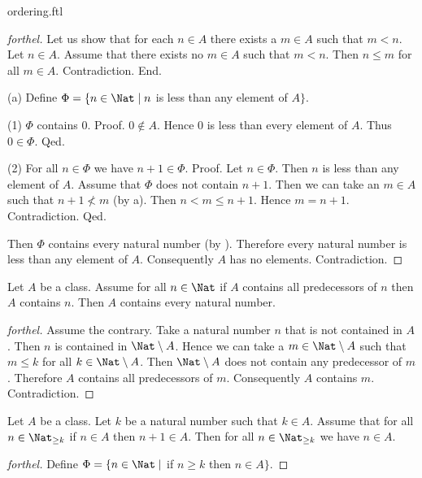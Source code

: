 \documentclass{naproche-library}
\begin{document}
\begin{smodule}{ordering.ftl}
\begin{proof}[forthel]
    Let us show that for each $n \in A$ there exists a $m \in A$ such that $m < n$.
      Let $n \in A$.
      Assume that there exists no $m \in A$ such that $m < n$.
      Then $n \leq m$ for all $m \in A$.
      Contradiction.
    End.

    (a) Define $\Phi = \{ n \in \Nat \mid n$ is less than any element of $A \}$.

    (1) $\Phi$ contains $0$. \newline
    Proof.
      $0 \notin A$.
      Hence $0$ is less than every element of $A$.
      Thus $0 \in \Phi$.
    Qed.

    (2) For all $n \in \Phi$ we have $n + 1 \in \Phi$. \newline
    Proof.
      Let $n \in \Phi$.
      Then $n$ is less than any element of $A$.
      Assume that $\Phi$ does not contain $n + 1$.
      Then we can take an $m \in A$ such that $n + 1 \nless m$ (by a).
      Then $n < m \leq n + 1$.
      Hence $m = n + 1$.
      Contradiction.
    Qed.

    Then $\Phi$ contains every natural number (by ).
    Therefore every natural number is less than any element of $A$.
    Consequently $A$ has no elements.
    Contradiction.
  \end{proof}

  \begin{theorem}[forthel,id=ARITHMETIC_04_3609801697263616]
    Let $A$ be a class.
    Assume for all $n \in \Nat$ if $A$ contains all predecessors of $n$ then $A$ contains $n$.
    Then $A$ contains every natural number.
  \end{theorem}
  \begin{proof}[forthel]
    Assume the contrary.
    Take a natural number $n$ that is not contained in $A$.
    Then $n$ is contained in $\Nat \setminus A$.
    Hence we can take a $m \in \Nat \setminus A$ such that $m \leq k$ for all $k \in \Nat \setminus A$.
    Then $\Nat \setminus A$ does not contain any predecessor of $m$.
    Therefore $A$ contains all predecessors of $m$.
    Consequently $A$ contains $m$.
    Contradiction.
  \end{proof}

  \begin{theorem}[forthel,id=ARITHMETIC_04_4976599269113856]
    Let $A$ be a class.
    Let $k$ be a natural number such that $k \in A$.
    Assume that for all $n \in \Nat_{\geq k}$ if $n \in A$ then $n + 1 \in A$.
    Then for all $n \in \Nat_{\geq k}$ we have $n \in A$.
  \end{theorem}
  \begin{proof}[forthel]
    Define $\Phi = \{n \in \Nat \mid$ if $n \geq k$ then $n \in A \}$.


\end{proof}
\end{smodule}
\end{document}

